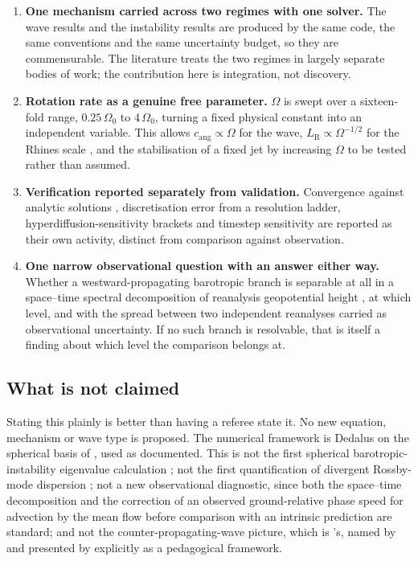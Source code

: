 \begin{enumerate}
\item \textbf{One mechanism carried across two regimes with one solver.} The wave
      results and the instability results are produced by the same code, the same
      conventions and the same uncertainty budget, so they are commensurable. The
      literature treats the two regimes in largely separate bodies of work; the
      contribution here is integration, not discovery.

\item \textbf{Rotation rate as a genuine free parameter.} $\Omega$ is swept over a
      sixteen-fold range, $0.25\,\Omega_0$ to $4\,\Omega_0$, turning a fixed
      physical constant into an independent variable. This allows
      $c_{\mathrm{ang}} \propto \Omega$ for the wave, $L_{\mathrm R} \propto
      \Omega^{-1/2}$ for the Rhines scale \citep{rhines1975,vallis1993}, and the
      stabilisation of a fixed jet by increasing $\Omega$ to be tested rather than
      assumed.

\item \textbf{Verification reported separately from validation.} Convergence
      against analytic solutions \citep{williamson1992,lauter2005}, discretisation
      error from a resolution ladder, hyperdiffusion-sensitivity brackets and
      timestep sensitivity are reported as their own activity, distinct from
      comparison against observation.

\item \textbf{One narrow observational question with an answer either way.}
      Whether a westward-propagating barotropic branch is separable at all in a
      space--time spectral decomposition of reanalysis geopotential height
      \citep{hersbach2020,kalnay1996}, at which level, and with the spread between
      two independent reanalyses carried as observational uncertainty. If no such
      branch is resolvable, that is itself a finding about which level the
      comparison belongs at.
\end{enumerate}

\subsection{What is not claimed}

Stating this plainly is better than having a referee state it. No new equation,
mechanism or wave type is proposed. The numerical framework is Dedalus
\citep{burns2020} on the spherical basis of \citet{vasil2019}, used as documented.
This is not the first spherical barotropic-instability eigenvalue calculation
\citep{skiba2004,skiba2008}; not the first quantification of divergent
Rossby-mode dispersion \citep{longuethiggins1968,kasahara1976}; not a new
observational diagnostic, since both the space--time decomposition and the
correction of an observed ground-relative phase speed for advection by the mean
flow before comparison with an intrinsic prediction are standard; and not the
counter-propagating-wave picture, which is \citet{bretherton1966}'s, named by
\citet{hoskins1985} and presented by \citet{heifetz1999} explicitly as a
pedagogical framework.

